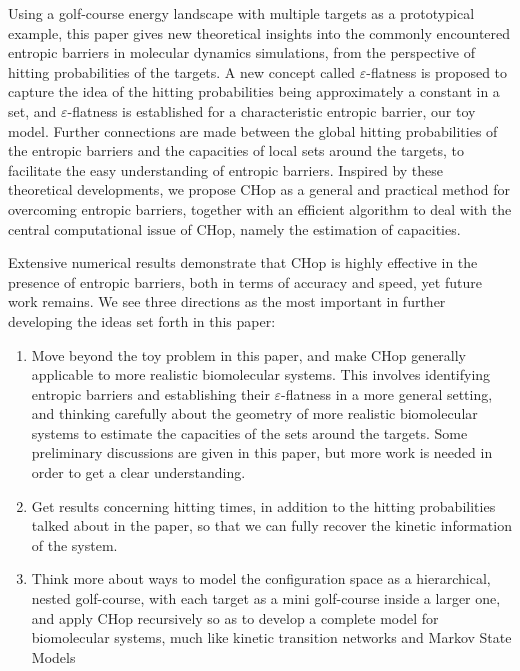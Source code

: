 \documentclass[english, aip, jcp, priprint, graphicx,floatfix]{revtex4-1}
\theoremstyle{plain}
\theoremstyle{definition}
\theoremstyle{plain}
\begin{document}
Using a golf-course energy landscape with multiple targets as a prototypical example, this paper gives new theoretical insights into the commonly encountered entropic barriers in molecular dynamics simulations, from the perspective of hitting probabilities of the targets. A new concept called $\varepsilon$-flatness is proposed to capture the idea of the hitting probabilities being approximately a constant in a set, and $\varepsilon$-flatness is established for a characteristic entropic barrier, our toy model. Further connections are made between the global hitting probabilities of the entropic barriers and the capacities of local sets around the targets, to facilitate the easy understanding of entropic barriers. Inspired by these theoretical developments, we propose CHop as a general and practical method for overcoming entropic barriers, together with an efficient algorithm to deal with the central computational issue of CHop, namely the estimation of capacities.

Extensive numerical results demonstrate that CHop is highly effective in the presence of entropic barriers, both in terms of accuracy and speed, yet future work remains. We see three directions as the most important in further developing the ideas set forth in this paper:
\begin{enumerate}
	\item Move beyond the toy problem in this paper, and make CHop generally applicable to more realistic biomolecular systems. This involves identifying entropic barriers and establishing their $\varepsilon$-flatness in a more general setting, and thinking carefully about the geometry of more realistic biomolecular systems to estimate the capacities of the sets around the targets. Some preliminary discussions are given in this paper, but more work is needed in order to get a clear understanding.
	\item Get results concerning hitting times, in addition to the hitting probabilities talked about in the paper, so that we can fully recover the kinetic information of the system.
	\item Think more about ways to model the configuration space as a hierarchical, nested golf-course, with each target as a mini golf-course inside a larger one, and apply CHop recursively so as to develop a complete model for biomolecular systems, much like kinetic transition networks\cite{Noe2006-cs, Wales2006-ur} and Markov State Models \cite{Pande2010-yi, Chodera2014-bh, Husic2018-xp}
\end{enumerate}
\end{document}
